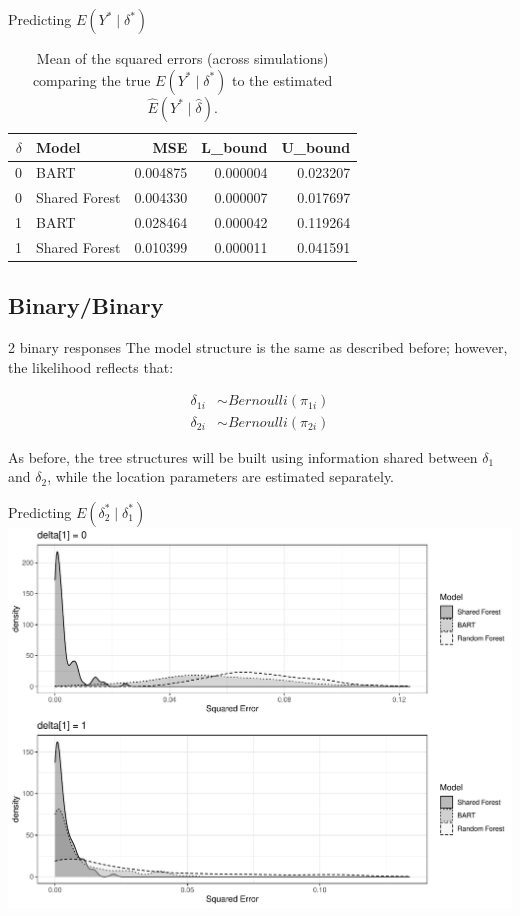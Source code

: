 \documentclass{beamer}
\begin{document}
\begin{frame}{Predicting $E(Y^* \mid \delta^*)$ }

\begin{table}[ht]
\centering
\begin{tabular}{rlrrr}
  \hline
$\delta$ & Model & MSE & L\_bound & U\_bound \\ 
  \hline
0 & BART & 0.004875 & 0.000004 & 0.023207 \\ 
  0 & Shared Forest & 0.004330 & 0.000007 & 0.017697 \\ 
  1 & BART & 0.028464 & 0.000042 & 0.119264 \\ 
  1 & Shared Forest & 0.010399 & 0.000011 & 0.041591 \\ 
   \hline
\end{tabular}
\caption{\label{tab:mse} Mean of the squared errors (across simulations) comparing the true $E(Y^* \mid \delta^*)$ to the estimated $\hat{E}(Y^* \mid \hat{\delta})$.}
\end{table}

\end{frame}

\subsection{Binary/Binary} 

\begin{frame}{2 binary responses}
The model structure is the same as described before; however, the likelihood reflects that:

\begin{align}
\delta_{1i} &\sim Bernoulli(\pi_{1i}) \\
\delta_{2i} &\sim Bernoulli(\pi_{2i})
\end{align}

As before, the tree structures will be built using information shared between $\delta_1$ and $\delta_2$, while the location parameters are estimated separately. 

\end{frame}

\begin{frame}{Predicting $E(\delta_2^* \mid \delta_1^*)$ }
\includegraphics[width = .9\linewidth]{binary_sim_results.pdf}
\end{frame}
\end{document}
